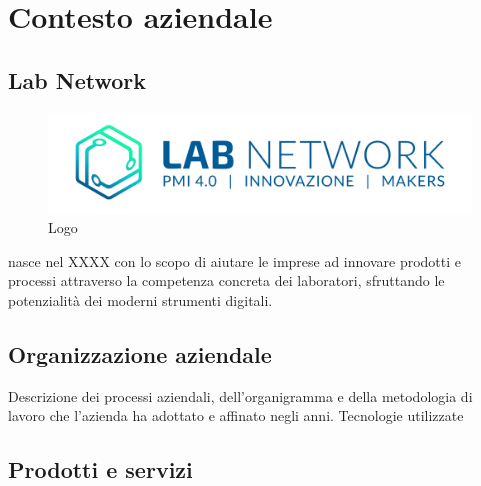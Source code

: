 
\chapter{Contesto aziendale}
\label{cap:introduzione}

\section{Lab Network}

\begin{figure}[h]
	\begin{center}
	\includegraphics[scale=0.4]{immagini/LOGO_LABNETWORK.png}
	\caption{Logo \lab{}}
	\end{center}
\end{figure}

\lab{} nasce nel XXXX con lo scopo di aiutare le imprese ad innovare prodotti e processi attraverso la competenza concreta dei laboratori, sfruttando le potenzialità dei moderni strumenti digitali.

\section{Organizzazione aziendale}
Descrizione dei processi aziendali, dell'organigramma e della metodologia di lavoro che l'azienda ha adottato e affinato negli anni.
Tecnologie utilizzate

\newpage
\section{Prodotti e servizi}
